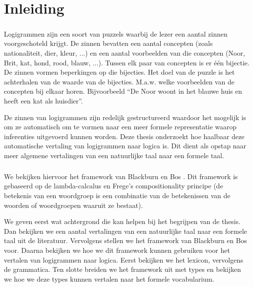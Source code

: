 \chapter{Inleiding}
\paragraph{} Logigrammen zijn een soort van puzzels waarbij de lezer een aantal zinnen voorgeschoteld krijgt. De zinnen bevatten een aantal concepten (zoals nationaliteit, dier, kleur, ...) en een aantal voorbeelden van die concepten (Noor, Brit, kat, hond, rood, blauw, ...). Tussen elk paar van concepten is er \'e\'en bijectie. De zinnen vormen beperkingen op die bijecties. Het doel van de puzzle is het achterhalen van de waarde van de bijecties. M.a.w. welke voorbeelden van de concepten bij elkaar horen. Bijvoorbeeld ``De Noor woont in het blauwe huis en heeft een kat als huisdier''.

De zinnen van logigrammen zijn redelijk gestructureerd waardoor het mogelijk is om ze automatisch om te vormen naar een meer formele representatie waarop inferenties uitgevoerd kunnen worden. Deze thesis onderzoekt hoe haalbaar deze automatische vertaling van logigrammen naar logica is. Dit dient als opstap naar meer algemene vertalingen van een natuurlijke taal naar een formele taal.

\paragraph{} We bekijken hiervoor het framework van Blackburn en Bos \cite{Blackburn2005, Blackburn2006}. Dit framework is gebaseerd op de lambda-calcalus en Frege's compositionality principe (de betekenis van een woordgroep is een combinatie van de betekenissen van de woorden of woordgroepen waaruit ze bestaat).

We geven eerst wat achtergrond die kan helpen bij het begrijpen van de thesis. Dan bekijken we een aantal vertalingen van een natuurlijke taal naar een formele taal uit de literatuur. Vervolgens stellen we het framework van Blackburn en Bos voor. Daarna bekijken we hoe we dit framework kunnen gebruiken voor het vertalen van logigrammen naar logica. Eerst bekijken we het lexicon, vervolgens de grammatica. Ten slotte breiden we het framework uit met types en bekijken we hoe we deze types kunnen vertalen naar het formele vocabularium.
